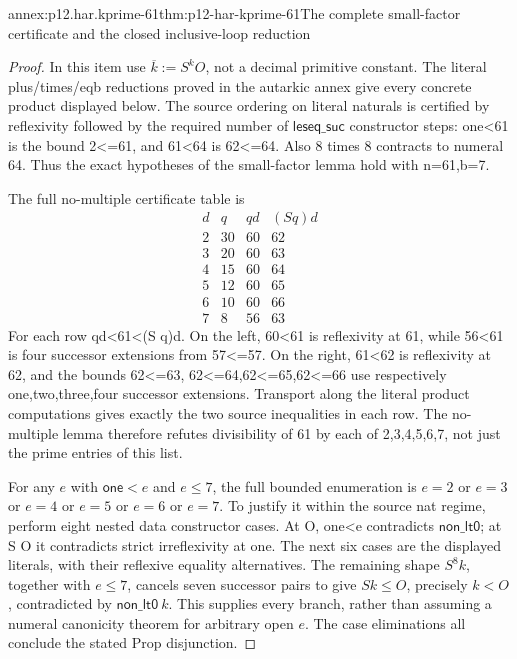 \begin{annexitem}{annex:p12.har.kprime-61}{thm:p12-har-kprime-61}{The complete small-factor certificate and the closed inclusive-loop reduction}
\begin{proof}
In this item use \(\overline{k}:=S^kO\), not a decimal primitive
constant. The literal plus/times/eqb reductions proved in the autarkic
annex give every concrete product displayed below. The source ordering
on literal naturals is certified by reflexivity followed by the required
number of \(\mathsf{leseq\_suc}\) constructor steps: one<61 is the bound 2<=61,
and 61<64 is 62<=64. Also 8 times 8 contracts to numeral 64.
Thus the exact hypotheses of the small-factor lemma hold with n=61,b=7.

The full no-multiple certificate table is
\[
\begin{array}{c|c|c|c}
 d&q&qd& (S q)d\\\hline
 2&30&60&62\\
 3&20&60&63\\
 4&15&60&64\\
 5&12&60&65\\
 6&10&60&66\\
 7&8&56&63
\end{array}
\]
For each row qd<61<(S q)d. On the left, 60<61 is reflexivity
at 61, while 56<61 is four successor extensions from 57<=57.
On the right, 61<62 is reflexivity at 62, and the bounds 62<=63,
62<=64,62<=65,62<=66 use respectively one,two,three,four successor
extensions. Transport along the literal product computations gives
exactly the two source inequalities in each row. The no-multiple
lemma therefore refutes divisibility of 61 by each of 2,3,4,5,6,7,
not just the prime entries of this list.

For any \(e\) with \(\mathsf{one}<e\) and \(e\leq7\), the full bounded enumeration is
\(e=2\) or \(e=3\) or \(e=4\) or \(e=5\) or \(e=6\) or \(e=7\). To justify it within
the source nat regime, perform eight nested data constructor cases.
At O, one<e contradicts \(\mathsf{non\_lt0}\); at S O it contradicts strict
irreflexivity at one. The next six cases are the displayed literals,
with their reflexive equality alternatives. The remaining shape
\(S^8 k\), together with \(e\leq7\), cancels seven successor pairs to give
\(S k\leq O\), precisely \(k<O\), contradicted by \(\mathsf{non\_lt0}\ k\). This supplies
every branch, rather than assuming a numeral canonicity theorem for
arbitrary open \(e\). The case eliminations all conclude the stated Prop
disjunction.


\end{proof}
\end{annexitem}
